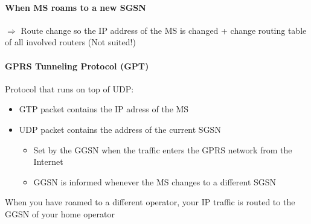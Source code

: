 \paragraph{When MS roams to a new SGSN} $\Rightarrow$ Route change so the IP address
of the MS is changed + change routing table of all involved routers (Not suited!)

\paragraph{GPRS Tunneling Protocol (GPT)}
Protocol that runs on top of UDP:
\begin{itemize}
	\item GTP packet contains the IP adress of the MS
	\item UDP packet contains the address of the current SGSN
	\begin{itemize}
		\item Set by the GGSN when the traffic enters the GPRS network
		from the Internet
		\item GGSN is informed whenever the MS changes to a different
		SGSN
	\end{itemize}
\end{itemize}
When you have roamed to a different operator, your IP traffic is routed to the 
GGSN of your home operator

